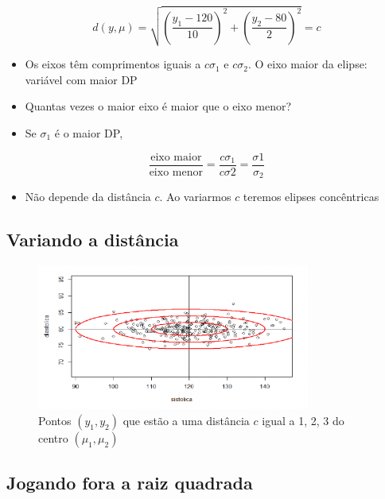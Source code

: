 \documentclass[
  letterpaper,
  DIV=11,
  numbers=noendperiod]{scrartcl}
\providecommand{\tightlist}{%
  \setlength{\itemsep}{0pt}\setlength{\parskip}{0pt}}\usepackage{longtable,booktabs,array}
\begin{document}
\[ d(y, \mu)  = \sqrt{\left(\frac{y_1-120}{10}\right)^2 + \left(\frac{y_2-80}{2}\right)^2} =c \]

\begin{itemize}
\tightlist
\item
  Os eixos têm comprimentos iguais a \(c\sigma_1\) e \(c\sigma_2\). O
  eixo maior da elipse: variável com maior DP
\item
  Quantas vezes o maior eixo é maior que o eixo menor?
\item
  Se \(\sigma_1\) é o maior DP,
\end{itemize}

\[\frac{\text{eixo maior}}{\text{eixo menor}} = \frac{c\sigma_1}{c\sigma2} = \frac{\sigma1}{\sigma_2}\]

\begin{itemize}
\tightlist
\item
  Não depende da distância \(c\). Ao variarmos \(c\) teremos elipses
  concêntricas
\end{itemize}

\hypertarget{variando-a-distuxe2ncia}{%
\subsection{Variando a distância}\label{variando-a-distuxe2ncia}}

\begin{figure}

{\centering \includegraphics[width=0.8\textwidth,height=\textheight]{figs/Aula07/distancias.png}

}

\caption{Pontos \((y_1, y_2)\) que estão a uma distância \(c\) igual a
1, 2, 3 do centro \((\mu_1, \mu_2)\)}

\end{figure}

\hypertarget{jogando-fora-a-raiz-quadrada}{%
\subsection{Jogando fora a raiz
quadrada}\label{jogando-fora-a-raiz-quadrada}}
\end{document}
